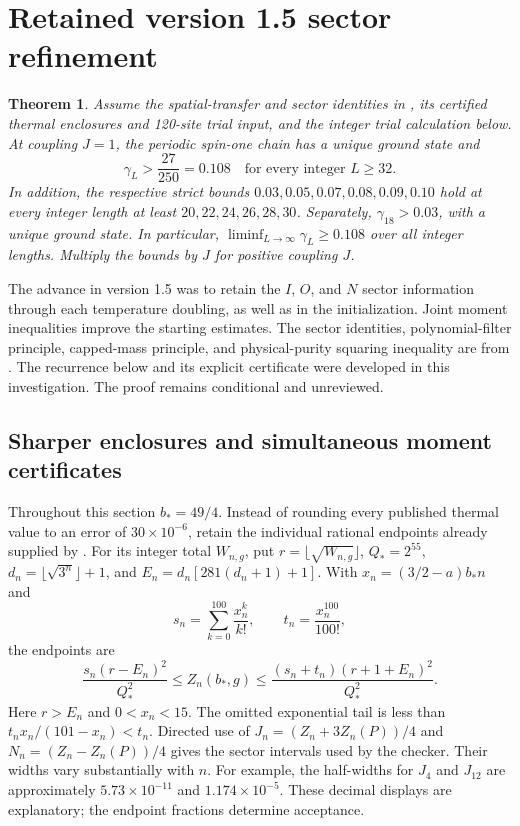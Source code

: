\documentclass[11pt,a4paper]{article}
\newtheorem{theorem}{Theorem}
\newcommand{\gap}{\gamma}
\begin{document}
\section{Retained version 1.5 sector refinement}
\begin{theorem}\label{thm:sector}
Assume the spatial-transfer and sector identities in
\cite[Section 3]{upstream}, its certified thermal enclosures and
120-site trial input, and the integer trial calculation below.
At coupling $J=1$, the periodic spin-one chain has a unique ground state and
\[
 \boxed{\gap_L>\frac{27}{250}=0.108\quad\text{for every integer }L\ge32.}
\]
In addition, the respective strict bounds $0.03,0.05,0.07,0.08,0.09,0.10$
hold at every integer length at least $20,22,24,26,28,30$.
Separately, $\gap_{18}>0.03$, with a unique ground state.
In particular, $\liminf_{L\to\infty}\gap_L\ge0.108$ over all integer
lengths. Multiply the bounds by $J$ for positive coupling $J$.
\end{theorem}

The advance in version 1.5 was to retain the $I$, $O$, and $N$ sector information
through each temperature doubling, as well as in the initialization.
Joint moment inequalities improve the starting estimates. The sector
identities, polynomial-filter principle, capped-mass principle, and
physical-purity squaring inequality are from \cite{upstream}.
The recurrence below and its explicit certificate were developed in
this investigation. The proof remains conditional and unreviewed.

\subsection{Sharper enclosures and simultaneous moment certificates}
Throughout this section $b_*=49/4$. Instead of rounding every published
thermal value to an error of $30\times10^{-6}$, retain the individual
rational endpoints already supplied by \cite[Appendix B]{upstream}.
For its integer total $W_{n,g}$, put $r=\lfloor\sqrt{W_{n,g}}\rfloor$,
$Q_*=2^{55}$, $d_n=\lfloor\sqrt{3^n}\rfloor+1$, and
$E_n=d_n[281(d_n+1)+1]$. With $x_n=(3/2-a)b_*n$ and
\[
 s_n=\sum_{k=0}^{100}\frac{x_n^k}{k!},\qquad t_n=\frac{x_n^{100}}{100!},
\]
the endpoints are
\[
 \frac{s_n(r-E_n)^2}{Q_*^2}\le Z_n(b_*,g)
 \le\frac{(s_n+t_n)(r+1+E_n)^2}{Q_*^2}.
\]
Here $r>E_n$ and $0<x_n<15$. The omitted exponential tail is less
than $t_nx_n/(101-x_n)<t_n$. Directed use of
$J_n=(Z_n+3Z_n(P))/4$ and $N_n=(Z_n-Z_n(P))/4$ gives the sector
intervals used by the checker. Their widths vary substantially with $n$.
For example, the half-widths for $J_4$ and $J_{12}$ are approximately
$5.73\times10^{-11}$ and $1.174\times10^{-5}$. These decimal displays
are explanatory; the endpoint fractions determine acceptance.
\end{document}
